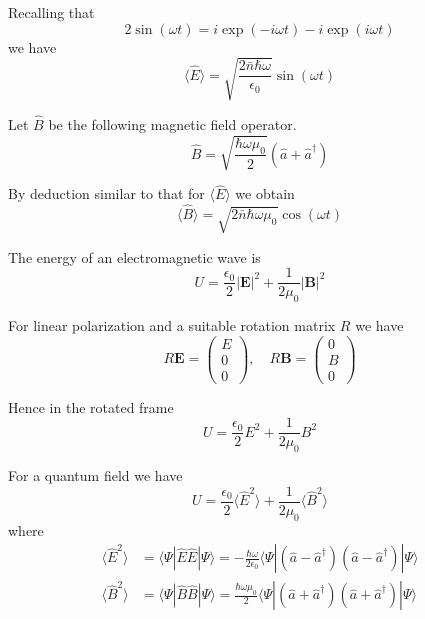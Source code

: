 \documentclass[12pt]{article}
\begin{document}
Recalling that
\begin{equation*}
2\sin(\omega t)=i\exp(-i\omega t)-i\exp(i\omega t)
\end{equation*}
we have
\begin{equation*}
\langle\hat E\rangle=\sqrt{\frac{2\bar n\hbar\omega}{\epsilon_0}}\sin(\omega t)
\end{equation*}

Let $\hat B$ be the following magnetic field operator.
\begin{equation*}
\hat B=\sqrt{\frac{\hbar\omega\mu_0}{2}}
(\hat a+\hat a^\dag)
\end{equation*}

By deduction similar to that for $\langle\hat E\rangle$ we obtain
\begin{equation*}
\langle\hat B\rangle=\sqrt{2\bar n\hbar\omega\mu_0}\cos(\omega t)
\end{equation*}

The energy of an electromagnetic wave is
\begin{equation*}
U=\frac{\epsilon_0}{2}|\mathbf E|^2+\frac{1}{2\mu_0}|\mathbf B|^2
\end{equation*}

For linear polarization and a suitable rotation matrix $R$ we have
\begin{equation*}
R\mathbf E=\begin{pmatrix}E\\0\\0\end{pmatrix},
\quad
R\mathbf B=\begin{pmatrix}0\\B\\0\end{pmatrix}
\end{equation*}

Hence in the rotated frame
\begin{equation*}
U=\frac{\epsilon_0}{2}E^2+\frac{1}{2\mu_0}B^2
\end{equation*}

For a quantum field we have
\begin{equation*}
U=\frac{\epsilon_0}{2}\langle\hat E^2\rangle+\frac{1}{2\mu_0}\langle\hat B^2\rangle
\end{equation*}
where
\begin{align*}
\langle\hat E^2\rangle
&=\langle\Psi|\hat E\hat E|\Psi\rangle
=-\frac{\hbar\omega}{2\epsilon_0}
\langle\Psi|(\hat a-\hat a^\dag)(\hat a-\hat a^\dag)|\Psi\rangle
\\
\langle\hat B^2\rangle
&=\langle\Psi|\hat B\hat B|\Psi\rangle
=\frac{\hbar\omega\mu_0}{2}
\langle\Psi|(\hat a+\hat a^\dag)(\hat a+\hat a^\dag)|\Psi\rangle
\end{align*}
\end{document}
